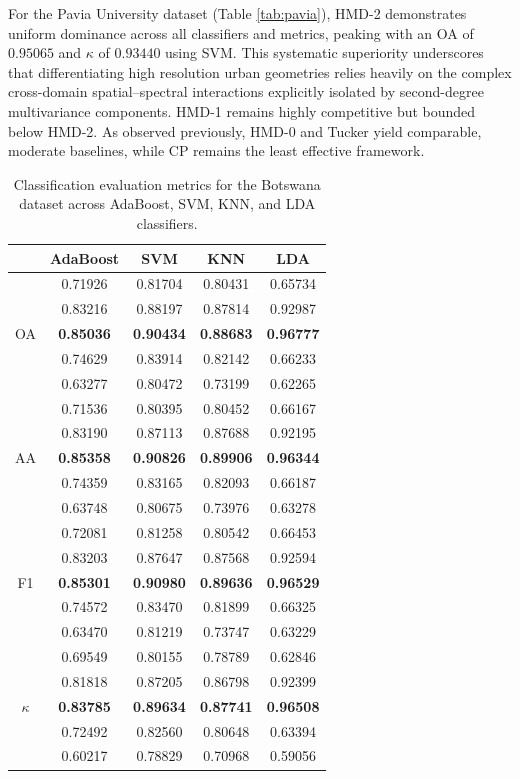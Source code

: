 \documentclass[12pt,onecolumn]{article}
\begin{document}
For the Pavia University dataset (Table \ref{tab:pavia}), HMD-2 demonstrates uniform dominance across all classifiers and metrics, peaking with an OA of $0.95065$ and $\kappa$ of $0.93440$ using SVM. This systematic superiority underscores that differentiating high resolution urban geometries relies heavily on the complex cross-domain spatial–spectral interactions explicitly isolated by second-degree multivariance components. HMD-1 remains highly competitive but bounded below HMD-2. As observed previously, HMD-0 and Tucker yield comparable, moderate baselines, while CP remains the least effective framework.

\begin{table}[h!]
\centering
\begin{tabular}{ccccc}
     \hline
     & AdaBoost & SVM & KNN & LDA \\
     \hline
     \multirow{5}{*}{OA} 
     & 0.71926 & 0.81704 & 0.80431 & 0.65734 \\
     & 0.83216 & 0.88197 & 0.87814 & 0.92987 \\
     & \textbf{0.85036} & \textbf{0.90434} & \textbf{0.88683} & \textbf{0.96777} \\
     & 0.74629 & 0.83914 & 0.82142 & 0.66233 \\
     & 0.63277 & 0.80472 & 0.73199 & 0.62265 \\
     
     \hline
     \multirow{5}{*}{AA}      
     & 0.71536 & 0.80395 & 0.80452 & 0.66167 \\
     & 0.83190 & 0.87113 & 0.87688 & 0.92195 \\
     & \textbf{0.85358} & \textbf{0.90826} & \textbf{0.89906} & \textbf{0.96344} \\
     & 0.74359 & 0.83165 & 0.82093 & 0.66187 \\
     & 0.63748 & 0.80675 & 0.73976 & 0.63278 \\
	 
	 \hline     
	 \multirow{5}{*}{F1} 
     & 0.72081 & 0.81258 & 0.80542 & 0.66453 \\
     & 0.83203 & 0.87647 & 0.87568 & 0.92594 \\
     & \textbf{0.85301} & \textbf{0.90980} & \textbf{0.89636} & \textbf{0.96529} \\
     & 0.74572 & 0.83470 & 0.81899 & 0.66325 \\
     & 0.63470 & 0.81219 & 0.73747 & 0.63229 \\
	 
	 \hline
	 \multirow{5}{*}{$\kappa$}      
     & 0.69549 & 0.80155 & 0.78789 & 0.62846 \\
     & 0.81818 & 0.87205 & 0.86798 & 0.92399 \\
     & \textbf{0.83785} & \textbf{0.89634} & \textbf{0.87741} & \textbf{0.96508} \\
     & 0.72492 & 0.82560 & 0.80648 & 0.63394 \\
     & 0.60217 & 0.78829 & 0.70968 & 0.59056 \\
     \hline
\end{tabular}
\caption{Classification evaluation metrics for the Botswana dataset across AdaBoost, SVM, KNN, and LDA classifiers.}
\label{tab:botswana}    
\end{table}
\end{document}
